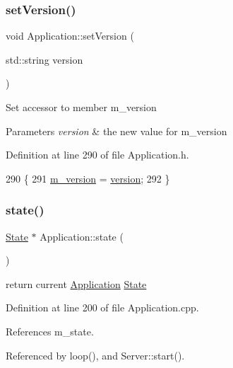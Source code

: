 \subsubsection{\texorpdfstring{set\+Version()}{setVersion()}}
{\footnotesize\ttfamily void Application\+::set\+Version (\begin{DoxyParamCaption}\item[{std\+::string}]{version }\end{DoxyParamCaption})\hspace{0.3cm}{\ttfamily [inline]}}

Set accessor to member m\+\_\+version 
\begin{DoxyParams}{Parameters}
{\em version} & the new value for m\+\_\+version \\
\hline
\end{DoxyParams}


Definition at line 290 of file Application.\+h.


\begin{DoxyCode}
290                                       \{
291     \hyperlink{classApplication_acbbdbd17a3a66782c54dbbe58a9ca8d8}{m\_version} = \hyperlink{classApplication_a060ac7b6d3a6cb111a9ed39bfd0350d1}{version};
292   \}
\end{DoxyCode}
\mbox{\label{classApplication_adfc9b92559f61c92224abf03f51cef47}} 
\subsubsection{\texorpdfstring{state()}{state()}}
{\footnotesize\ttfamily \hyperlink{classState}{State} $\ast$ Application\+::state (\begin{DoxyParamCaption}{ }\end{DoxyParamCaption})}

return current \hyperlink{classApplication}{Application} \hyperlink{classState}{State} 

Definition at line 200 of file Application.\+cpp.



References m\+\_\+state.



Referenced by loop(), and Server\+::start().


